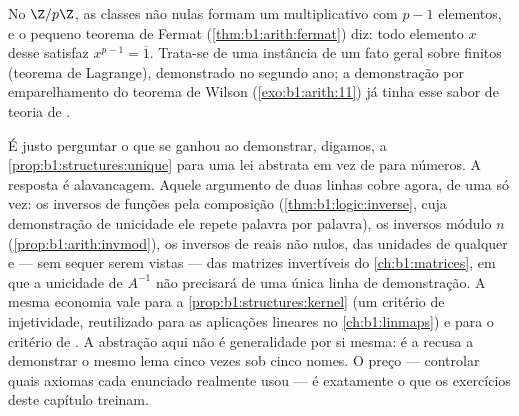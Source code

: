 \begin{remark}
No  $\Z/p\Z$, as classes não nulas formam um  multiplicativo
com $p - 1$ elementos, e o pequeno teorema de Fermat
(\cref{thm:b1:arith:fermat}) diz: todo elemento $x$ desse 
satisfaz $x^{p-1} = \overline 1$. Trata-se de uma instância de um fato geral
sobre  finitos (teorema de Lagrange), demonstrado no segundo
ano; a demonstração por emparelhamento do teorema de Wilson
(\cref{exo:b1:arith:11}) já tinha esse sabor de teoria de .
\end{remark}

\begin{remark}\label{rem:b1:structures:interlude}
É justo perguntar o que se ganhou ao demonstrar, digamos, a
\cref{prop:b1:structures:unique} para uma lei abstrata em vez de
para números. A resposta é alavancagem. Aquele argumento de duas linhas
cobre agora, de uma só vez: os inversos de funções pela composição
(\cref{thm:b1:logic:inverse}, cuja demonstração de unicidade ele repete
palavra por palavra), os inversos módulo $n$
(\cref{prop:b1:arith:invmod}), os inversos de reais não nulos, das
unidades de qualquer  e --- sem sequer serem vistas --- das
matrizes invertíveis do \cref{ch:b1:matrices}, em que a unicidade de $A^{-1}$
não precisará de uma única linha de demonstração. A mesma economia vale
para a \cref{prop:b1:structures:kernel} (um critério de injetividade,
reutilizado para as aplicações lineares no \cref{ch:b1:linmaps}) e para o
critério de . A abstração aqui não é generalidade por si
mesma: é a recusa a demonstrar o mesmo lema cinco vezes
sob cinco nomes. O preço --- controlar quais axiomas
cada enunciado realmente usou --- é exatamente o que os exercícios
deste capítulo treinam.
\end{remark}

